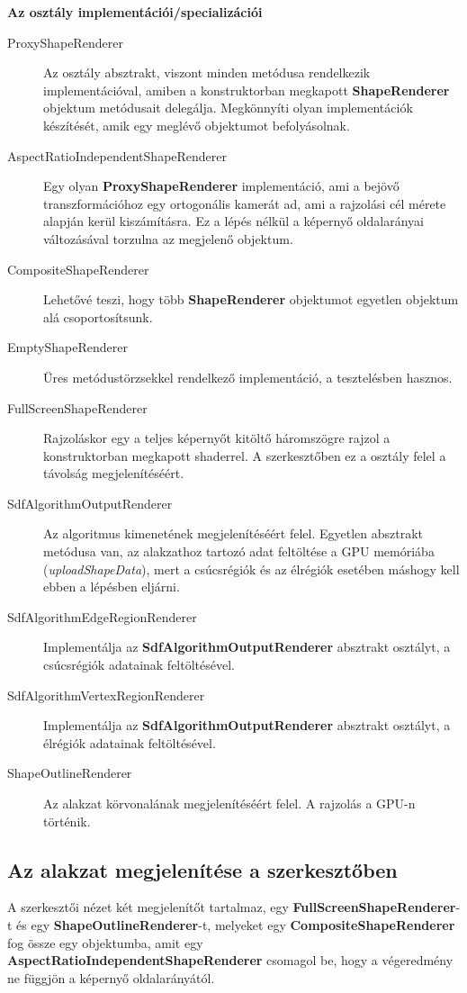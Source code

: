 \textbf{Az osztály implementációi/specializációi}

\begin{description}
	\item[ProxyShapeRenderer] Az osztály absztrakt, viszont minden metódusa rendelkezik implementációval, amiben a konstruktorban megkapott \textbf{ShapeRenderer} objektum metódusait delegálja. Megkönnyíti olyan implementációk készítését, amik egy meglévő objektumot befolyásolnak.
	\item[AspectRatioIndependentShapeRenderer] Egy olyan \textbf{ProxyShapeRenderer} implementáció, ami a bejövő transzformációhoz egy ortogonális kamerát ad, ami a rajzolási cél mérete alapján kerül kiszámításra. Ez a lépés nélkül a képernyő oldalarányai változásával torzulna az megjelenő objektum.
	\item[CompositeShapeRenderer] Lehetővé teszi, hogy több \textbf{ShapeRenderer} objektumot egyetlen objektum alá csoportosítsunk.
	\item[EmptyShapeRenderer] Üres metódustörzsekkel rendelkező implementáció, a tesztelésben hasznos.
	\item[FullScreenShapeRenderer] Rajzoláskor egy a teljes képernyőt kitöltő háromszögre rajzol a konstruktorban megkapott shaderrel. A szerkesztőben ez a osztály felel a távolság megjelenítéséért.
	\item[SdfAlgorithmOutputRenderer] Az algoritmus kimenetének megjelenítéséért felel. Egyetlen absztrakt metódusa van, az alakzathoz tartozó adat feltöltése a GPU memóriába (\textit{uploadShapeData}), mert a csúcsrégiók és az élrégiók esetében máshogy kell ebben a lépésben eljárni.
	\item[SdfAlgorithmEdgeRegionRenderer] Implementálja az \textbf{SdfAlgorithmOutputRenderer} absztrakt osztályt, a csúcsrégiók adatainak feltöltésével.
	\item[SdfAlgorithmVertexRegionRenderer] Implementálja az \textbf{SdfAlgorithmOutputRenderer} absztrakt osztályt, a élrégiók adatainak feltöltésével.
	\item[ShapeOutlineRenderer] Az alakzat körvonalának megjelenítéséért felel. A rajzolás a GPU-n történik.
\end{description}

\subsection{Az alakzat megjelenítése a szerkesztőben}

A szerkesztői nézet két megjelenítőt tartalmaz, egy \textbf{FullScreenShapeRenderer}-t és egy \textbf{ShapeOutlineRenderer}-t, melyeket egy \textbf{CompositeShapeRenderer} fog össze egy objektumba, amit egy \textbf{AspectRatioIndependentShapeRenderer} csomagol be, hogy a végeredmény ne függjön a képernyő oldalarányától.

